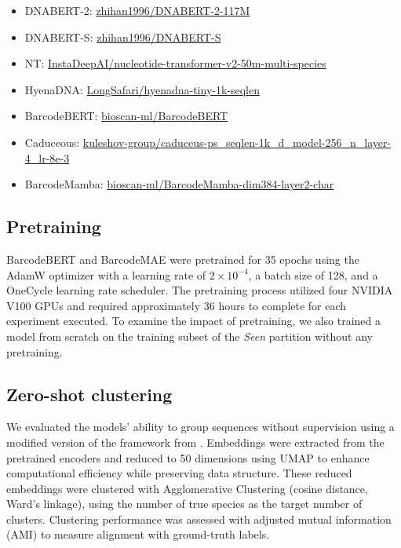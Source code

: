 \begin{itemize}
\item DNABERT-2: \href{https://huggingface.co/zhihan1996/DNABERT-2-117M}{zhihan1996/DNABERT-2-117M}
\item DNABERT-S: \href{https://huggingface.co/zhihan1996/DNABERT-S}{zhihan1996/DNABERT-S}
\item NT: \href{https://huggingface.co/InstaDeepAI/nucleotide-transformer-v2-50m-multi-species}{InstaDeepAI/nucleotide-transformer-v2-50m-multi-species}
\item HyenaDNA: \href{https://huggingface.co/LongSafari/hyenadna-tiny-1k-seqlen}{LongSafari/hyenadna-tiny-1k-seqlen}
\item BarcodeBERT: \href{https://huggingface.co/bioscan-ml/BarcodeBERT}{bioscan-ml/BarcodeBERT}
\item Caduceous: \href{https://huggingface.co/kuleshov-group/caduceus-ps_seqlen-1k_d_model-256_n_layer-4_lr-8e-3}{kuleshov-group/caduceus-ps\_seqlen-1k\_d\_model-256\_n\_layer-4\_lr-8e-3}
\item BarcodeMamba: \href{https://huggingface.co/bioscan-ml/BarcodeMamba}{bioscan-ml/BarcodeMamba-dim384-layer2-char}
\end{itemize}

\subsection{Pretraining}
BarcodeBERT and BarcodeMAE were pretrained for 35 epochs using the AdamW optimizer \cite{AdamW} with a learning rate of $2\times10^{-4}$, a batch size of 128, and a OneCycle learning rate scheduler. The pretraining process utilized four NVIDIA V100 GPUs and required approximately 36 hours to complete for each experiment executed. To examine the impact of pretraining, we also trained a model from scratch on the training subset of the \textit{Seen} partition without any pretraining. 

\subsection{Zero-shot clustering}

We evaluated the models’ ability to group sequences without supervision using a modified version of the framework from \iftoggle{arxiv}{\citet{zsc-Lowe-2024}}{Lowe et. al. \cite{zsc-Lowe-2024}}. Embeddings were extracted from the pretrained encoders and reduced to 50 dimensions using UMAP \citep{umap} to enhance computational efficiency while preserving data structure. These reduced embeddings were clustered with Agglomerative Clustering (cosine distance, Ward’s linkage), using the number of true species as the target number of clusters. Clustering performance was assessed with adjusted mutual information (AMI) to measure alignment with ground-truth labels.

